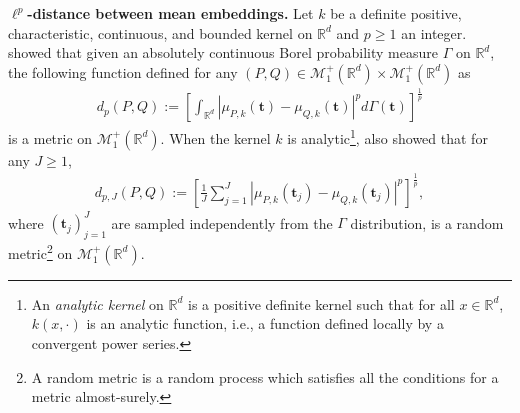 
\textbf{$\ell^p$-distance between mean embeddings.} Let $k$ be a definite positive, characteristic, continuous, and bounded kernel on $\mathbb{R}^d$ and $p\geq 1$ an integer. \citet{NEURIPS2019_0e2db0cb} showed that given an absolutely continuous Borel probability measure $\Gamma$ on $\mathbb{R}^d$, the following function defined for any  $(P,Q)\in\mathcal{M}_1^{+}(\mathbb{R}^d)\times\mathcal{M}_1^{+}(\mathbb{R}^d)$ as 
\begin{align}
\label{eq-dlp}
    d_{p}(P,Q):=\left[\int_{\mathbb{R}^d}|\mu_{P,k}(\mathbf{t})-\mu_{Q,k}(\mathbf{t})|^p d\Gamma(\mathbf{t})\right]^{\frac{1}{p}}
\end{align}
is a metric on $\mathcal{M}_1^{+}(\mathbb{R}^d)$.
When the kernel $k$ is analytic\footnote{An \emph{analytic kernel} on $\mathbb{R}^d$ is a positive definite kernel such that for all $x\in\mathbb{R}^d$, $k(x,\cdot)$ is an analytic function, i.e., a function defined locally by a convergent power series.}, \citet{NEURIPS2019_0e2db0cb} also showed that for any $J\geq 1$, 
\begin{align}
\label{eq-dlp_J}
    d_{p,J}(P,Q):=\left[\frac{1}{J}\sum_{j=1}^J |\mu_{P,k}(\mathbf{t}_j)-\mu_{Q,k}(\mathbf{t}_j)|^p\right]^{\frac{1}{p}},
\end{align}
where $(\mathbf{t}_j)_{j=1}^J$ are sampled independently from the $\Gamma$ distribution, is a random metric\footnote{A random metric is a random process which satisfies all the conditions for a metric almost-surely.} on $\mathcal{M}_1^{+}(\mathbb{R}^d)$.




